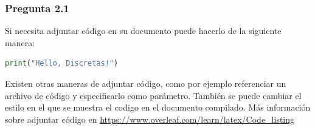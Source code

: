 \documentclass[12pt]{article}
\begin{document}
\subsubsection*{Pregunta 2.1}

Si necesita adjuntar código en su documento puede hacerlo de la siguiente manera:

\begin{lstlisting}[language=Python]
print("Hello, Discretas!")
\end{lstlisting}

Existen otras maneras de adjuntar código, como por ejemplo referenciar un archivo de código y especificarlo como parámetro. También se puede cambiar el estilo en el que se muestra el codigo en el documento compilado. Más información sobre adjuntar código en \href{https://www.overleaf.com/learn/latex/Code_listing}{https://www.overleaf.com/learn/latex/Code\_listing}

\end{document}
